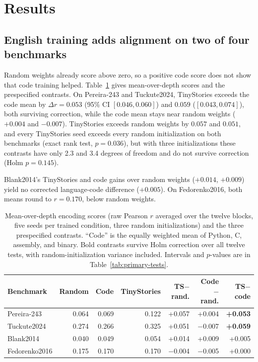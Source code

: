 \documentclass[mlmain]{jmlr}
\begin{document}
\section{Results}
\label{sec:results}

\subsection{English training adds alignment on two of four benchmarks}
\label{sec:results-gain}

Random weights already score above zero, so a positive code score does not show that code training helped. Table~\ref{tab:benchmarks} gives mean-over-depth scores and the prespecified contrasts. On Pereira-243 and Tuckute2024, TinyStories exceeds the code mean by $\Delta r = 0.053$ (95\% CI $[0.046, 0.060]$) and $0.059$ ($[0.043, 0.074]$), both surviving correction, while the code mean stays near random weights ($+0.004$ and $-0.007$). TinyStories exceeds random weights by $0.057$ and $0.051$, and every TinyStories seed exceeds every random initialization on both benchmarks (exact rank test, $p = 0.036$), but with three initializations these contrasts have only 2.3 and 3.4 degrees of freedom and do not survive correction (Holm $p = 0.145$).

Blank2014's TinyStories and code gains over random weights ($+0.014$, $+0.009$) yield no corrected language-code difference ($+0.005$). On Fedorenko2016, both means round to $r = 0.170$, below random weights.

\begin{table}[t]
  \centering
  \caption{Mean-over-depth encoding scores (raw Pearson $r$ averaged over the twelve blocks, five seeds per trained condition, three random initializations) and the three prespecified contrasts. ``Code'' is the equally weighted mean of Python, C, assembly, and binary. Bold contrasts survive Holm correction over all twelve tests, with random-initialization variance included. Intervals and $p$-values are in Table~\ref{tab:primary-tests}.}
  \label{tab:benchmarks}
  \small
  \setlength{\tabcolsep}{5pt}
  \begin{tabular}{lrrrrrr}
\toprule
Benchmark & Random & Code & TinyStories & TS$-$rand. & Code$-$rand. & TS$-$code \\
\midrule
Pereira-243 & 0.064 & 0.069 & 0.122 & +0.057 & +0.004 & \textbf{+0.053} \\
Tuckute2024 & 0.274 & 0.266 & 0.325 & +0.051 & $-$0.007 & \textbf{+0.059} \\
Blank2014 & 0.040 & 0.049 & 0.054 & +0.014 & +0.009 & +0.005 \\
Fedorenko2016 & 0.175 & 0.170 & 0.170 & $-$0.004 & $-$0.005 & +0.000 \\
\bottomrule
\end{tabular}
\end{table}
\end{document}
